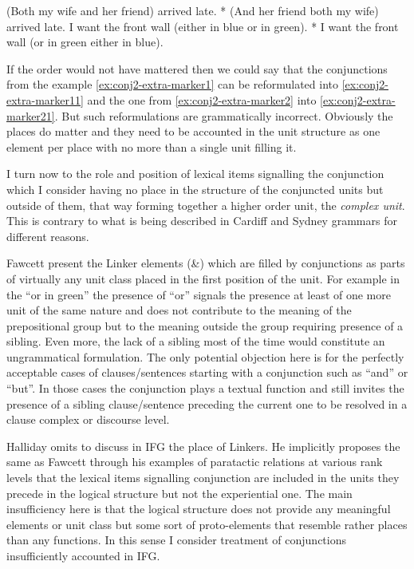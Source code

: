 \begin{exe}
	\ex\label{ex:conj2-extra-marker1}
	(Both my wife and her friend) arrived late.  
	\ex\label{ex:conj2-extra-marker11} * (And her friend both my wife) arrived late.
	\ex\label{ex:conj2-extra-marker2}
	I want the front wall (either in blue or in green). 
	\ex\label{ex:conj2-extra-marker21}
	* I want the front wall (or in green either in blue). 
\end{exe}

If the order would not have mattered then we could say that the conjunctions from the example \ref{ex:conj2-extra-marker1} can be reformulated into \ref{ex:conj2-extra-marker11} and the one from \ref{ex:conj2-extra-marker2} into \ref{ex:conj2-extra-marker21}. But such reformulations are grammatically incorrect. Obviously the places do matter and they need to be accounted in the unit structure as one element per place with no more than a single unit filling it.

I turn now to the role and position of lexical items signalling the conjunction which I consider having no place in the structure of the conjuncted units but outside of them, that way forming together a higher order unit, the \textit{complex unit}. This is contrary to what is being described in Cardiff and Sydney grammars for different reasons. 

Fawcett present the Linker elements (\&) which are filled by conjunctions as parts of virtually any unit class placed in the first position of the unit. For example in the ``or in green'' the presence of ``or'' signals the presence at least of one more unit of the same nature and does not contribute to the meaning of the prepositional group but to the meaning outside the group requiring presence of a sibling. Even more, the lack of a sibling most of the time would constitute an ungrammatical formulation. The only potential objection here is for the perfectly acceptable cases of clauses/sentences starting with a conjunction such as ``and'' or ``but''. In those cases the conjunction plays a textual function and still invites the presence of a sibling clause/sentence preceding the current one to be resolved in a clause complex or discourse level. 

Halliday omits to discuss in IFG \citep{Halliday2013} the place of Linkers. He implicitly proposes the same as Fawcett through his examples of paratactic relations at various rank levels \citep[422, 534, 564, 566]{Halliday2013} that the lexical items signalling conjunction are included in the units they precede in the logical structure but not the experiential one. The main insufficiency here is that the logical structure does not provide any meaningful elements or unit class but some sort of proto-elements that resemble rather places than any functions. In this sense I consider treatment of conjunctions insufficiently accounted in IFG.  

